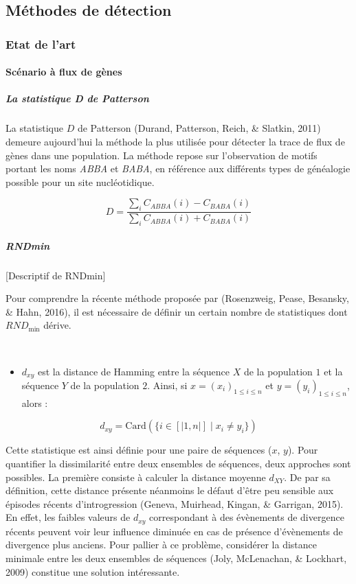 \documentclass[12pt,twoside]{reedthesis}
\providecommand{\tightlist}{%
  \setlength{\itemsep}{0pt}\setlength{\parskip}{0pt}}
\begin{document}
  \subsection{Méthodes de détection}\label{methodes-de-detection}
  
  \subsubsection{Etat de l'art}\label{etat-de-lart-1}
  
  \paragraph{Scénario à flux de gènes}\label{scenario-a-flux-de-genes}
  
  \subparagraph{La statistique D de
  Patterson}\label{la-statistique-d-de-patterson}
  
  La statistique \(D\) de Patterson (Durand, Patterson, Reich, \& Slatkin,
  2011) demeure aujourd'hui la méthode la plus utilisée pour détecter la
  trace de flux de gènes dans une population. La méthode repose sur
  l'observation de motifs portant les noms \emph{ABBA} et \emph{BABA}, en
  référence aux différents types de généalogie possible pour un site
  nucléotidique.
  
  \[ D = \displaystyle \frac{\sum_i C_{ABBA}(i) - C_{BABA}(i)}{\sum_i C_{ABBA}(i) + C_{BABA}(i)} \]
  
  \subparagraph{RNDmin}\label{rndmin}
  
  {[}Descriptif de RNDmin{]}
  
  Pour comprendre la récente méthode proposée par (Rosenzweig, Pease,
  Besansky, \& Hahn, 2016), il est nécessaire de définir un certain nombre
  de statistiques dont \(RND_{\text{min}}\) dérive.
  
  ~
  
  \begin{itemize}
  \tightlist
  \item
    \(d_{xy}\) est la distance de Hamming entre la séquence \(X\) de la
    population \(1\) et la séquence \(Y\) de la population \(2\). Ainsi,
    si \(x = (x_i)_{1 \leq i \leq n}\) et \(y = (y_i)_{1 \leq i \leq n}\),
    alors :
  \end{itemize}
  
  \[d_{xy} = \text{Card}(\{i \in [|1, n|] \; | \; x_i \neq y_i \})\]
  
  Cette statistique est ainsi définie pour une paire de séquences (\(x\),
  \(y\)). Pour quantifier la dissimilarité entre deux ensembles de
  séquences, deux approches sont possibles. La première consiste à
  calculer la distance moyenne \(d_{XY}\). De par sa définition, cette
  distance présente néanmoins le défaut d'être peu sensible aux épisodes
  récents d'introgression (Geneva, Muirhead, Kingan, \& Garrigan, 2015).
  En effet, les faibles valeurs de \(d_{xy}\) correspondant à des
  évènements de divergence récents peuvent voir leur influence diminuée en
  cas de présence d'évènements de divergence plus anciens. Pour pallier à
  ce problème, considérer la distance minimale entre les deux ensembles de
  séquences (Joly, McLenachan, \& Lockhart, 2009) constitue une solution
  intéressante.
  
\end{document}

